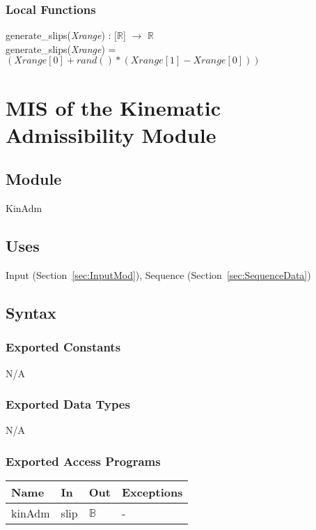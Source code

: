 \documentclass[12pt, titlepage]{article}
\begin{document}
\subsubsection{Local Functions}
generate\_slips(\textit{Xrange}) : [$\mathbb{R}$] $\rightarrow$ $\mathbb{R}$\\
generate\_slips(\textit{Xrange}) = $(Xrange[0] + rand()*(Xrange[1] - 
Xrange[0]))$


\newpage
\section{MIS of the Kinematic Admissibility
	Module} \label{sec:KinAdmMod}

\subsection{Module}
KinAdm

\subsection{Uses}
Input (Section~\ref{sec:InputMod}), Sequence (Section~\ref{sec:SequenceData})

\subsection{Syntax}

\subsubsection{Exported Constants}
N/A

\subsubsection{Exported Data Types}
N/A

\subsubsection{Exported Access Programs}

\begin{center}
	\renewcommand*{\arraystretch}{1.5}
	\begin{tabular} {p{}  p{}  p{} 
			p{} } \hline 
		\textbf{Name} & \textbf{In} & \textbf{Out} & \textbf{Exceptions} \\ 
		\hline
		
		kinAdm & slip & $\mathbb{B}$ & - \\ \hline
		
	\end{tabular}
\end{center}
\end{document}
